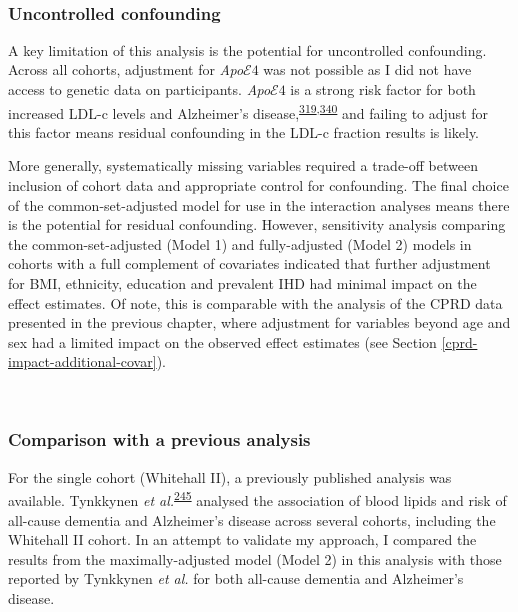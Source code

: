 \documentclass[a4paper, twoside]{templates/ociamthesis}
\begin{document}
~

\hypertarget{uncontrolled-confounding}{%
\subsubsection{Uncontrolled confounding}\label{uncontrolled-confounding}}

A key limitation of this analysis is the potential for uncontrolled confounding. Across all cohorts, adjustment for \emph{Apo}\(\mathcal{E}4\) was not possible as I did not have access to genetic data on participants. \emph{Apo}\(\mathcal{E}4\) is a strong risk factor for both increased LDL-c levels and Alzheimer's disease,\textsuperscript{\protect\hyperlink{ref-bennet2007}{319},\protect\hyperlink{ref-safieh2019}{340}} and failing to adjust for this factor means residual confounding in the LDL-c fraction results is likely.

More generally, systematically missing variables required a trade-off between inclusion of cohort data and appropriate control for confounding. The final choice of the common-set-adjusted model for use in the interaction analyses means there is the potential for residual confounding. However, sensitivity analysis comparing the common-set-adjusted (Model 1) and fully-adjusted (Model 2) models in cohorts with a full complement of covariates indicated that further adjustment for BMI, ethnicity, education and prevalent IHD had minimal impact on the effect estimates. Of note, this is comparable with the analysis of the CPRD data presented in the previous chapter, where adjustment for variables beyond age and sex had a limited impact on the observed effect estimates (see Section \ref{cprd-impact-additional-covar}).

~

\hypertarget{comparison-with-a-previous-analysis}{%
\subsubsection{Comparison with a previous analysis}\label{comparison-with-a-previous-analysis}}

For the single cohort (Whitehall II), a previously published analysis was available. Tynkkynen \emph{et al.}\textsuperscript{\protect\hyperlink{ref-tynkkynen2018}{245}} analysed the association of blood lipids and risk of all-cause dementia and Alzheimer's disease across several cohorts, including the Whitehall II cohort. In an attempt to validate my approach, I compared the results from the maximally-adjusted model (Model 2) in this analysis with those reported by Tynkkynen \emph{et al.} for both all-cause dementia and Alzheimer's disease.
\end{document}
